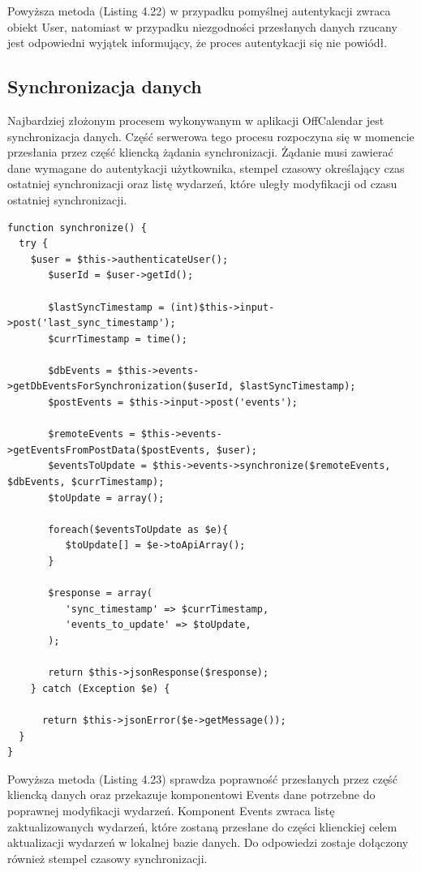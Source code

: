 Powyższa metoda (Listing 4.22) w przypadku pomyślnej autentykacji zwraca obiekt User, natomiast w przypadku niezgodności przesłanych danych rzucany jest odpowiedni wyjątek informujący, że proces autentykacji się nie powiódł.

\subsection{Synchronizacja danych}
\label{serwSynDanych}

Najbardziej złożonym procesem wykonywanym w aplikacji OffCalendar jest synchronizacja danych. Część serwerowa tego procesu rozpoczyna się w momencie przesłania przez część kliencką żądania synchronizacji. Żądanie musi zawierać dane wymagane do autentykacji użytkownika, stempel czasowy określający czas ostatniej synchronizacji oraz listę wydarzeń, które uległy modyfikacji od czasu ostatniej synchronizacji.

\begin{lstlisting}[style=php, caption=Metoda synchronize interfejsu programowania Events\_api., label=amb, captionpos=b]
function synchronize() {
  try {
   	$user = $this->authenticateUser();
       $userId = $user->getId();

       $lastSyncTimestamp = (int)$this->input->post('last_sync_timestamp');
       $currTimestamp = time();

       $dbEvents = $this->events->getDbEventsForSynchronization($userId, $lastSyncTimestamp);       	 
       $postEvents = $this->input->post('events');

       $remoteEvents = $this->events->getEventsFromPostData($postEvents, $user);
       $eventsToUpdate = $this->events->synchronize($remoteEvents, $dbEvents, $currTimestamp);
       $toUpdate = array();
       	 
       foreach($eventsToUpdate as $e){
          $toUpdate[] = $e->toApiArray();
       }

       $response = array(
          'sync_timestamp' => $currTimestamp,
          'events_to_update' => $toUpdate,
       );

       return $this->jsonResponse($response);
    } catch (Exception $e) {

      return $this->jsonError($e->getMessage());
  }
}
\end{lstlisting}

Powyższa metoda (Listing 4.23) sprawdza poprawność przesłanych przez część kliencką danych oraz przekazuje komponentowi Events dane potrzebne do poprawnej modyfikacji wydarzeń. Komponent Events zwraca listę zaktualizowanych wydarzeń, które zostaną przesłane do części klienckiej celem aktualizacji wydarzeń w lokalnej bazie danych. Do odpowiedzi zostaje dołączony również stempel czasowy synchronizacji.

